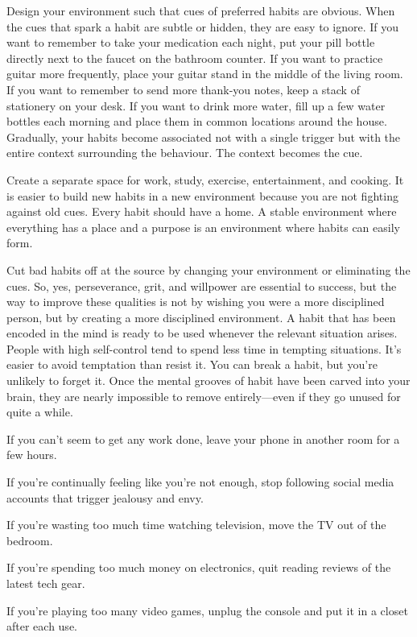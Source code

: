\documentclass[10pt,twocolumn]{../notes}
\begin{document}
\Advice Design your environment such that cues of preferred habits are obvious.
\Fact When the cues that spark a habit are subtle or hidden, they are easy to ignore.
\Example If you want to remember to take your medication each night, put your pill bottle directly next to the faucet on the bathroom counter.
\Example If you want to practice guitar more frequently, place your guitar stand in the middle of the living room.
\Example If you want to remember to send more thank-you notes, keep a stack of stationery on your desk.
\Example If you want to drink more water, fill up a few water bottles each morning and place them in common locations around the house.
\Fact Gradually, your habits become associated not with a single trigger but with the entire context surrounding the behaviour. The context becomes the cue.

\Advice Create a separate space for work, study, exercise, entertainment, and cooking.
\Fact It is easier to build new habits in a new environment because you are not fighting against old cues.
\Quote Every habit should have a home.
\Quote A stable environment where everything has a place and a purpose is an environment where habits can easily form.

\Advice Cut bad habits off at the source by changing your environment or eliminating the cues.
\Quote So, yes, perseverance, grit, and willpower are essential to success, but the way to improve these qualities is not by wishing you were a more disciplined person, but by creating a more disciplined environment.
\Fact A habit that has been encoded in the mind is ready to be used whenever the relevant situation arises.
\Fact People with high self-control tend to spend less time in tempting situations. It’s easier to avoid temptation than resist it.
\Fact You can break a habit, but you’re unlikely to forget it. Once the mental grooves of habit have been carved into your brain, they are nearly impossible to remove entirely—even if they go unused for quite a while.
\begin{Examplelist}{}
  \item If you can’t seem to get any work done, leave your phone in another room for a few hours.
  \item If you’re continually feeling like you’re not enough, stop following social media accounts that trigger jealousy and envy.
  \item If you’re wasting too much time watching television, move the TV out of the bedroom.
  \item If you’re spending too much money on electronics, quit reading reviews of the latest tech gear.
  \item If you’re playing too many video games, unplug the console and put it in a closet after each use.
\end{Examplelist}
\end{document}
